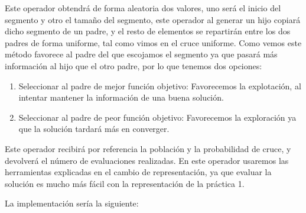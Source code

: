 \documentclass[12pt, spanish]{article}
\begin{document}
Este operador obtendrá de forma aleatoria dos valores, uno será el inicio del segmento y otro el tamaño del segmento, este operador al generar un hijo copiará dicho segmento de un padre, y el resto de elementos se repartirán entre los dos padres de forma uniforme, tal como vimos en el cruce uniforme. Como vemos este método favorece al padre del que escojamos el segmento ya que pasará más información al hijo que el otro padre, por lo que tenemos dos opciones:

\begin{enumerate}
	\item Seleccionar al padre de mejor función objetivo: Favorecemos la explotación, al intentar mantener la información de una buena solución.
	\item Seleccionar al padre de peor función objetivo: Favorecemos la exploración ya que la solución tardará más en converger.
\end{enumerate}
 
Este operador recibirá por referencia la población y la probabilidad de cruce, y devolverá el número de evaluaciones realizadas. En este operador usaremos las herramientas explicadas en el cambio de representación, ya que evaluar la solución es mucho más fácil con la representación de la práctica 1.
 
La implementación sería la siguiente:
\end{document}
